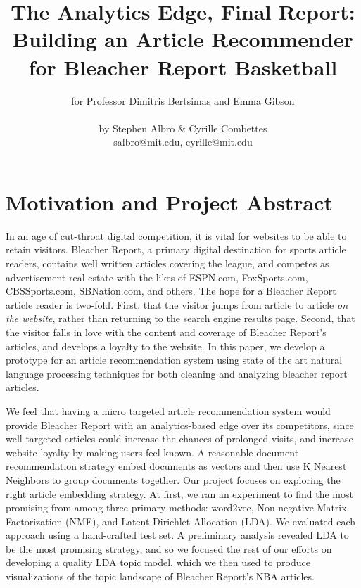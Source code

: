 \documentclass[11pt]{article}
\title{The Analytics Edge, Final Report:\\ Building an Article Recommender for Bleacher Report Basketball}
\author{for Professor Dimitris Bertsimas and Emma Gibson \text{ } \\ \\ by Stephen Albro \& Cyrille Combettes \\ salbro@mit.edu, cyrille@mit.edu}
\begin{document}
\maketitle{}


\section{Motivation and Project Abstract}
In an age of cut-throat digital competition, it is vital for websites to be able to retain visitors. Bleacher Report, a primary digital destination for sports article readers, contains well written articles covering the league, and competes as advertisement real-estate with the likes of ESPN.com, FoxSports.com, CBSSports.com, SBNation.com, and others. The hope for a Bleacher Report article reader is two-fold. First, that the visitor jumps from article to article \textit{on the website}, rather than returning to the search engine results page.  Second, that the visitor falls in love with the content and coverage of Bleacher Report's articles, and develops a loyalty to the website. In this paper, we develop a prototype for an article recommendation system using state of the art natural language processing techniques for both cleaning and analyzing bleacher report articles.

We feel that having a micro targeted article recommendation system would provide Bleacher Report with an analytics-based edge over its competitors, since well targeted articles could increase the chances of prolonged visits, and increase website loyalty by making users feel known.   A reasonable document-recommendation strategy embed documents as vectors and then use K Nearest Neighbors to group documents together. Our project focuses on exploring the right article embedding strategy.  At first, we ran an experiment to find the most promising from among  three primary methods: word2vec, Non-negative Matrix Factorization (NMF), and Latent Dirichlet Allocation (LDA).  We evaluated each approach using a hand-crafted test set.  A preliminary analysis revealed LDA to be the most promising strategy, and so we focused the rest of our efforts on developing a quality LDA topic model, which we then used to produce visualizations of the topic landscape of Bleacher Report's NBA articles. 
\end{document}
